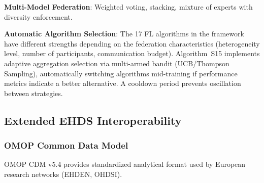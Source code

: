 \documentclass[conference]{IEEEtran}
\begin{document}
\textbf{Multi-Model Federation}: Weighted voting, stacking, mixture of experts with diversity enforcement.

\textbf{Automatic Algorithm Selection}: The 17 FL algorithms in the framework have different strengths depending on the federation characteristics (heterogeneity level, number of participants, communication budget). Algorithm~S15 implements adaptive aggregation selection via multi-armed bandit (UCB/Thompson Sampling), automatically switching algorithms mid-training if performance metrics indicate a better alternative. A cooldown period prevents oscillation between strategies.

\begin{figure}[htbp]
\centering
{}
\end{figure}


\subsection{Extended EHDS Interoperability}
\label{sec:interop}

\subsubsection{OMOP Common Data Model}

OMOP CDM v5.4 provides standardized analytical format used by European research networks (EHDEN, OHDSI).
\end{document}
